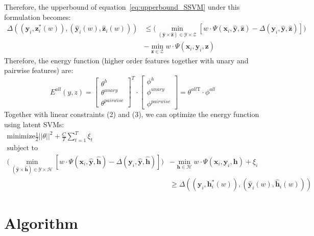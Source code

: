 \documentclass{article}
\begin{document}
		Therefore, the upperbound of equation~\ref{eq:upperbound_SSVM} under this formulation becomes:
		\begin{align}
		\label{eq:upperbound_LSSVM}
		\Delta((\mathbf{y}_i,\mathbf{z}^*_i(w)),(\mathbf{\hat{y}}_i(w),\mathbf{\hat{z}}_i(w)))
		&\leq \bigg(\min_{(\mathbf{\hat{y}} \times \mathbf{\hat{z}}) \in \mathcal{Y} \times \mathcal{Z}} [w\cdot\Psi(\mathbf{x}_i,\mathbf{\hat{y}},\mathbf{\hat{z}}) - \Delta(\mathbf{y}_i,\mathbf{\hat{y}},\mathbf{\hat{z}})]\bigg)\\
		&-\min_{\mathbf{z} \in \mathcal{Z}} w \cdot \Psi(\mathbf{x}_i,\mathbf{y}_i,\mathbf{z})
		\end{align}
		Therefore, the energy function (higher order features together with unary and pairwise features) are:
			\begin{equation}
			E^{all}(y,z) = \begin{bmatrix}
			\theta^h\\
			\theta^{unary}\\
			\theta^{pairwise}
			\end{bmatrix}^T 
			\cdot \begin{bmatrix}
			\phi^h\\
			\phi^{unary}\\
			\phi^{pairwise}
			\end{bmatrix}=\theta^{all\text{T}}\cdot\phi^{all}
			\end{equation}
		Together with linear constraints (2) and (3), we can optimize the energy function using latent SVMs:
		\begin{align}
		\label{eq:qpobject}
		\text{minimize}    \frac{1}{2}||\theta||^2 + \frac{C}{T}\sum_{t=1}^T{\xi_t} \\
		\text{subject to}\\
				\bigg(\min_{(\mathbf{\hat{y}} \times \mathbf{\hat{h}}) \in \mathcal{Y} \times \mathcal{H}} [w\cdot\Psi(\mathbf{x}_i,\mathbf{\hat{y}},\mathbf{\hat{h}}) - \Delta(\mathbf{y}_i,\mathbf{\hat{y}},\mathbf{\hat{h}})]\bigg)
				&-\min_{\mathbf{h} \in \mathcal{H}} w \cdot \Psi(\mathbf{x}_i,\mathbf{y}_i,\mathbf{h})
				+\xi_i\\
				&\geq \Delta((\mathbf{y}_i,\mathbf{h}^*_i(w)),(\mathbf{\hat{y}}_i(w),\mathbf{\hat{h}}_i(w)))
		\end{align}
		
	\section{Algorithm}
	
\end{document}
